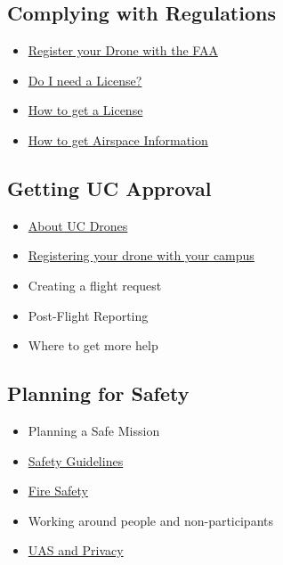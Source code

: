 \documentclass[
]{book}
\providecommand{\tightlist}{%
  \setlength{\itemsep}{0pt}\setlength{\parskip}{0pt}}
\begin{document}
\hypertarget{complying-with-regulations}{%
\subsection*{Complying with Regulations}\label{complying-with-regulations}}

\begin{itemize}
\tightlist
\item
  \protect\hyperlink{ch-register}{Register your Drone with the FAA}
\item
  \protect\hyperlink{ch-license}{Do I need a License?}
\item
  \protect\hyperlink{ch-get-license}{How to get a License}
\item
  \protect\hyperlink{ch-airspace-info}{How to get Airspace Information}
\end{itemize}

\hypertarget{getting-uc-approval}{%
\subsection*{Getting UC Approval}\label{getting-uc-approval}}

\begin{itemize}
\tightlist
\item
  \protect\hyperlink{ch-about-UCdrones}{About UC Drones}
\item
  \protect\hyperlink{ch-add-drone}{Registering your drone with your campus}
\item
  Creating a flight request
\item
  Post-Flight Reporting
\item
  Where to get more help
\end{itemize}

\hypertarget{planning-for-safety}{%
\subsection*{Planning for Safety}\label{planning-for-safety}}

\begin{itemize}
\tightlist
\item
  Planning a Safe Mission
\item
  \protect\hyperlink{ch-safety-guidelines}{Safety Guidelines}
\item
  \protect\hyperlink{ch-fire-safety}{Fire Safety}
\item
  Working around people and non-participants
\item
  \protect\hyperlink{ch-privacy}{UAS and Privacy}
\end{itemize}
\end{document}
